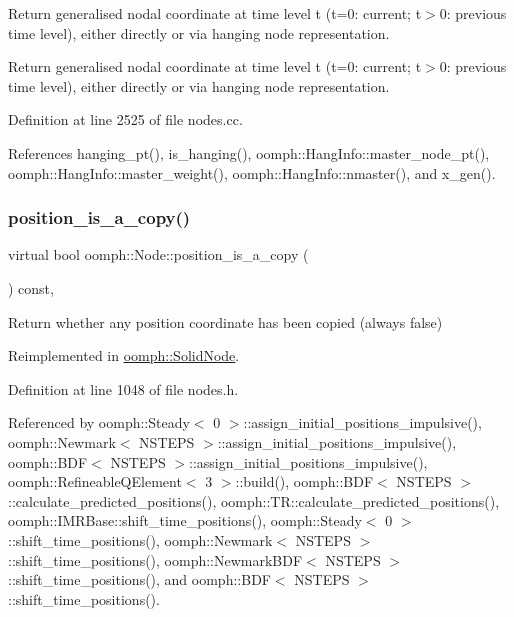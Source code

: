 Return generalised nodal coordinate at time level t (t=0\+: current; t$>$0\+: previous time level), either directly or via hanging node representation. 

Return generalised nodal coordinate at time level t (t=0\+: current; t$>$0\+: previous time level), either directly or via hanging node representation. 

Definition at line 2525 of file nodes.\+cc.



References hanging\+\_\+pt(), is\+\_\+hanging(), oomph\+::\+Hang\+Info\+::master\+\_\+node\+\_\+pt(), oomph\+::\+Hang\+Info\+::master\+\_\+weight(), oomph\+::\+Hang\+Info\+::nmaster(), and x\+\_\+gen().

\mbox{\label{classoomph_1_1Node_a80fe9192b35baa5321e8d0ffba4b8b8a}} 
\subsubsection{\texorpdfstring{position\+\_\+is\+\_\+a\+\_\+copy()}{position\_is\_a\_copy()}\hspace{0.1cm}{\footnotesize\ttfamily [1/2]}}
{\footnotesize\ttfamily virtual bool oomph\+::\+Node\+::position\+\_\+is\+\_\+a\+\_\+copy (\begin{DoxyParamCaption}{ }\end{DoxyParamCaption}) const\hspace{0.3cm}{\ttfamily [inline]}, {\ttfamily [virtual]}}



Return whether any position coordinate has been copied (always false) 



Reimplemented in \hyperlink{classoomph_1_1SolidNode_aa8d9a8e77ccc142be77767b33c09532a}{oomph\+::\+Solid\+Node}.



Definition at line 1048 of file nodes.\+h.



Referenced by oomph\+::\+Steady$<$ 0 $>$\+::assign\+\_\+initial\+\_\+positions\+\_\+impulsive(), oomph\+::\+Newmark$<$ N\+S\+T\+E\+P\+S $>$\+::assign\+\_\+initial\+\_\+positions\+\_\+impulsive(), oomph\+::\+B\+D\+F$<$ N\+S\+T\+E\+P\+S $>$\+::assign\+\_\+initial\+\_\+positions\+\_\+impulsive(), oomph\+::\+Refineable\+Q\+Element$<$ 3 $>$\+::build(), oomph\+::\+B\+D\+F$<$ N\+S\+T\+E\+P\+S $>$\+::calculate\+\_\+predicted\+\_\+positions(), oomph\+::\+T\+R\+::calculate\+\_\+predicted\+\_\+positions(), oomph\+::\+I\+M\+R\+Base\+::shift\+\_\+time\+\_\+positions(), oomph\+::\+Steady$<$ 0 $>$\+::shift\+\_\+time\+\_\+positions(), oomph\+::\+Newmark$<$ N\+S\+T\+E\+P\+S $>$\+::shift\+\_\+time\+\_\+positions(), oomph\+::\+Newmark\+B\+D\+F$<$ N\+S\+T\+E\+P\+S $>$\+::shift\+\_\+time\+\_\+positions(), and oomph\+::\+B\+D\+F$<$ N\+S\+T\+E\+P\+S $>$\+::shift\+\_\+time\+\_\+positions().

